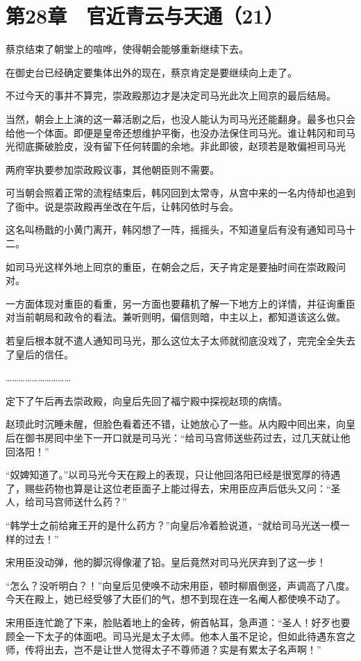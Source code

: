 \section{第28章　官近青云与天通（21）}

蔡京结束了朝堂上的喧哗，使得朝会能够重新继续下去。

在御史台已经确定要集体出外的现在，蔡京肯定是要继续向上走了。

不过今天的事并不算完，崇政殿那边才是决定司马光此次上囘京的最后结局。

当然，朝会上上演的这一幕活剧之后，也没人能认为司马光还能翻身。最多也只会给他一个体面。即便是皇帝还想维护平衡，也没办法保住司马光。谁让韩冈和司马光彻底撕破脸皮，没有留下任何转圜的余地。非此即彼，赵顼若是敢偏袒司马光

两府宰执要参加崇政殿议事，其他朝臣则不需要。

可当朝会照着正常的流程结束后，韩冈回到太常寺，从宫中来的一名内侍却也追到了衙中。说是崇政殿再坐改在午后，让韩冈依时与会。

这名叫杨戬的小黄门离开，韩冈想了一阵，摇摇头，不知道皇后有没有通知司马十二。

如司马光这样外地上囘京的重臣，在朝会之后，天子肯定是要抽时间在崇政殿问对。

一方面体现对重臣的看重，另一方面也要藉机了解一下地方上的详情，并征询重臣对当前朝局和政令的看法。兼听则明，偏信则暗，中主以上，都知道该这么做。

若皇后根本就不遣人通知司马光，那么这位太子太师就彻底没戏了，完完全全失去了皇后的信任。

…………………………

定下了午后再去崇政殿，向皇后先回了福宁殿中探视赵顼的病情。

赵顼此时沉睡未醒，但脸色看着还不错，让她放心了一些。从内殿中囘出来，向皇后在御书房囘中坐下一开口就是司马光：“给司马宫师送些药过去，过几天就让他回洛阳！”

“奴婢知道了。”以司马光今天在殿上的表现，只让他回洛阳已经是很宽厚的待遇了，赐些药物也算是让这位老臣面子上能过得去，宋用臣应声后低头又问：“圣人，给司马宫师送什么药？”

“韩学士之前给雍王开的是什么药方？”向皇后冷着脸说道，“就给司马光送一模一样的过去！”

宋用臣没动弹，他的脚沉得像灌了铅。皇后竟然对司马光厌弃到了这一步！

“怎么？没听明白？！”向皇后见使唤不动宋用臣，顿时柳眉倒竖，声调高了八度。今天在殿上，她已经受够了大臣们的气，想不到现在连一名阉人都使唤不动了。

宋用臣连忙跪了下来，脸贴着地上的金砖，俯首帖耳，急声道：“圣人！好歹也要顾全一下太子的体面吧。司马光是太子太师。他本人虽不足论，但如此待遇东宫之师，传将出去，岂不是让世人觉得太子不尊师道？实是有累太子名声啊！”

